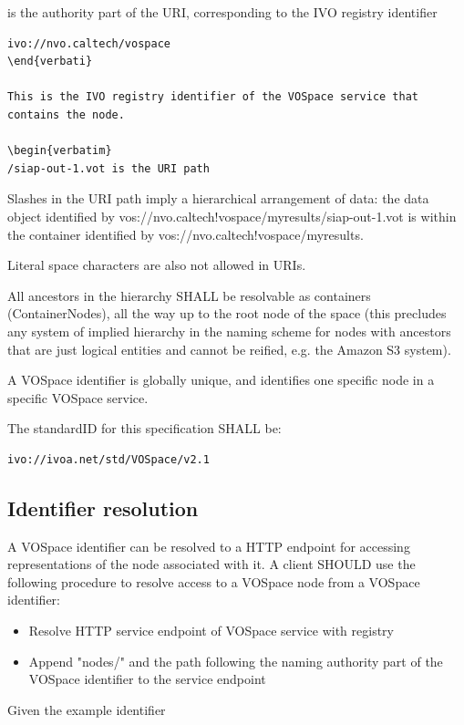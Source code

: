 \documentclass[11pt,a4paper]{ivoa}
\begin{document}
is the authority part of the URI, corresponding to the IVO registry identifier

\begin{verbatim}
ivo://nvo.caltech/vospace
\end{verbati}

This is the IVO registry identifier of the VOSpace service that contains the node.

\begin{verbatim}
/siap-out-1.vot is the URI path
\end{verbatim}

Slashes in the URI path imply a hierarchical arrangement of data: the data object identified by vos://nvo.caltech!vospace/myresults/siap-out-1.vot is within the container identified by vos://nvo.caltech!vospace/myresults.

Literal space characters are also not allowed in URIs.

All ancestors in the hierarchy SHALL be resolvable as containers (ContainerNodes), all the way up to the root node of the space (this precludes any system of implied hierarchy in the naming scheme for nodes with ancestors that are just logical entities and cannot be reified, e.g. the Amazon S3 system).

A VOSpace identifier is globally unique, and identifies one specific node in a specific VOSpace service.

The standardID for this specification SHALL be:
\begin{verbatim}
ivo://ivoa.net/std/VOSpace/v2.1
\end{verbatim}

\subsection{Identifier resolution}
A VOSpace identifier can be resolved to a HTTP endpoint for accessing representations of the node associated with it. A client SHOULD use the following procedure to resolve access to a VOSpace node from a VOSpace identifier:

\begin{itemize}
    \item Resolve HTTP service endpoint of VOSpace service with registry
    \item Append "nodes/" and the path following the naming authority part of the VOSpace identifier to the service endpoint
\end{itemize}

Given the example identifier
\end{document}
